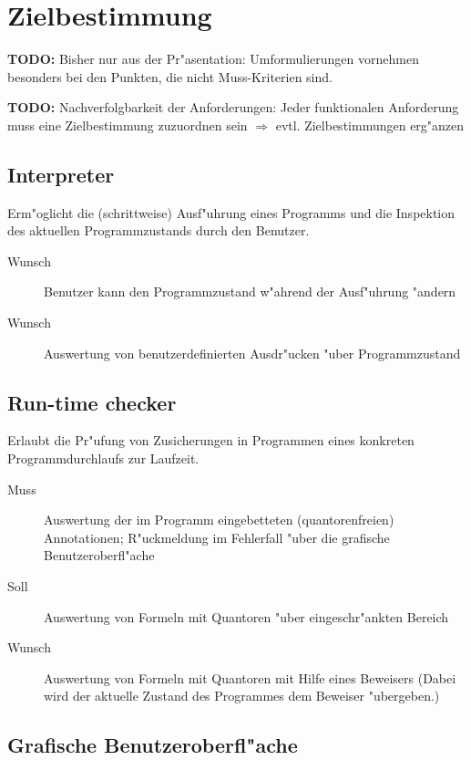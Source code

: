 \section{Zielbestimmung}%

\textbf{TODO:} Bisher nur aus der Pr"asentation: Umformulierungen vornehmen besonders bei den Punkten, die nicht Muss-Kriterien sind.%

\textbf{TODO:} Nachverfolgbarkeit der Anforderungen: Jeder funktionalen Anforderung muss eine Zielbestimmung zuzuordnen sein $\Rightarrow$ evtl. Zielbestimmungen erg"anzen%

\subsection{\siehe Interpreter}%

Erm"oglicht die (schrittweise) Ausf"uhrung eines \siehe Programms und die Inspektion des aktuellen \siehe Programmzustands durch den Benutzer.%

\begin{description}%
    \item[Wunsch] Benutzer kann den Programmzustand w"ahrend der Ausf"uhrung "andern%
    \item[Wunsch] Auswertung von benutzerdefinierten \siehe Ausdr"ucken "uber Programmzustand%
\end{description}%

\subsection{\siehe Run-time checker}%

Erlaubt die Pr"ufung von \siehe Zusicherungen in Programmen eines konkreten Programmdurchlaufs zur Laufzeit.%

\begin{description}%
    \item [Muss] Auswertung der im Programm eingebetteten (quantorenfreien) \siehe Annotationen; R"uckmeldung im Fehlerfall "uber die grafische Benutzeroberfl"ache%
    \item [Soll] Auswertung von Formeln mit \siehe Quantoren "uber eingeschr"ankten Bereich%
    \item [Wunsch] Auswertung von Formeln mit Quantoren mit Hilfe eines \siehe Beweisers (Dabei wird der aktuelle Zustand des Programmes dem Beweiser "ubergeben.)%
\end{description}%

\subsection{Grafische Benutzeroberfl"ache}%

